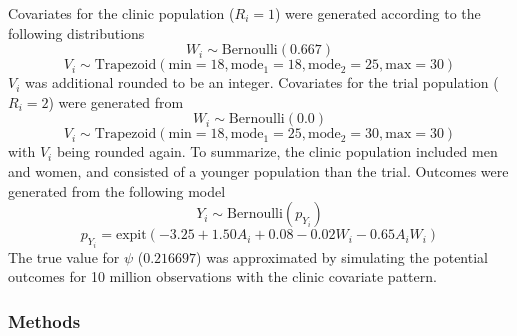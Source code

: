 \documentclass[]{article}
\begin{document}
Covariates for the clinic population ($R_i = 1$) were generated according to the following distributions
\[W_i \sim \text{Bernoulli}(0.667)\]
\[V_i \sim \text{Trapezoid}(\text{min}=18, \text{mode}_1 = 18, \text{mode}_2 = 25, \text{max} = 30)\]
$V_i$ was additional rounded to be an integer. Covariates for the trial population ($R_i=2$) were generated from
\[W_i \sim \text{Bernoulli}(0.0)\]
\[V_i \sim \text{Trapezoid}(\text{min}=18, \text{mode}_1 = 25, \text{mode}_2 = 30, \text{max} = 30)\]
with $V_i$ being rounded again. To summarize, the clinic population included men and women, and consisted of a younger population than the trial. Outcomes were generated from the following model
\[Y_i \sim \text{Bernoulli}(p_{Y_{i}})\]
\[p_{Y_i} = \text{expit}(-3.25 + 1.50 A_i + 0.08 - 0.02 W_i -0.65 A_i W_i)\]
The true value for $\psi$ ($0.216697$) was approximated by simulating the potential outcomes for 10 million observations with the clinic covariate pattern.

\subsubsection*{Methods}
\end{document}
